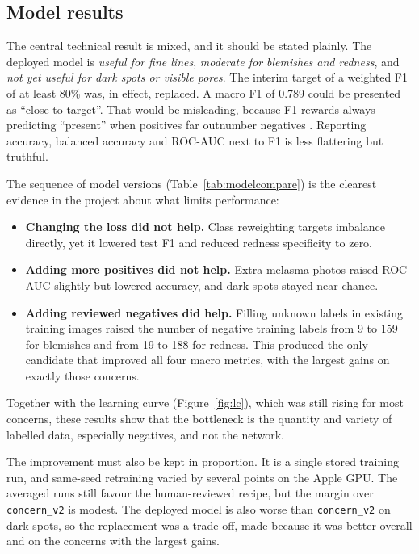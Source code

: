 \subsection*{Model results}

The central technical result is mixed, and it should be stated plainly. The deployed model is \emph{useful for fine lines}, \emph{moderate for blemishes and redness}, and \emph{not yet useful for dark spots or visible pores}. The interim target of a weighted F1 of at least 80\% was, in effect, replaced. A macro F1 of 0.789 could be presented as ``close to target''. That would be misleading, because F1 rewards always predicting ``present'' when positives far outnumber negatives \citep{chicco2020}. Reporting accuracy, balanced accuracy and ROC-AUC next to F1 is less flattering but truthful.

The sequence of model versions (Table~\ref{tab:modelcompare}) is the clearest evidence in the project about what limits performance:
\begin{itemize}
  \item \textbf{Changing the loss did not help.} Class reweighting targets imbalance directly, yet it lowered test F1 and reduced redness specificity to zero.
  \item \textbf{Adding more positives did not help.} Extra melasma photos raised ROC-AUC slightly but lowered accuracy, and dark spots stayed near chance.
  \item \textbf{Adding reviewed negatives did help.} Filling unknown labels in existing training images raised the number of negative training labels from 9 to 159 for blemishes and from 19 to 188 for redness. This produced the only candidate that improved all four macro metrics, with the largest gains on exactly those concerns.
\end{itemize}
Together with the learning curve (Figure~\ref{fig:lc}), which was still rising for most concerns, these results show that the bottleneck is the quantity and variety of labelled data, especially negatives, and not the network.

The improvement must also be kept in proportion. It is a single stored training run, and same-seed retraining varied by several points on the Apple GPU. The averaged runs still favour the human-reviewed recipe, but the margin over \texttt{concern\_v2} is modest. The deployed model is also worse than \texttt{concern\_v2} on dark spots, so the replacement was a trade-off, made because it was better overall and on the concerns with the largest gains.

